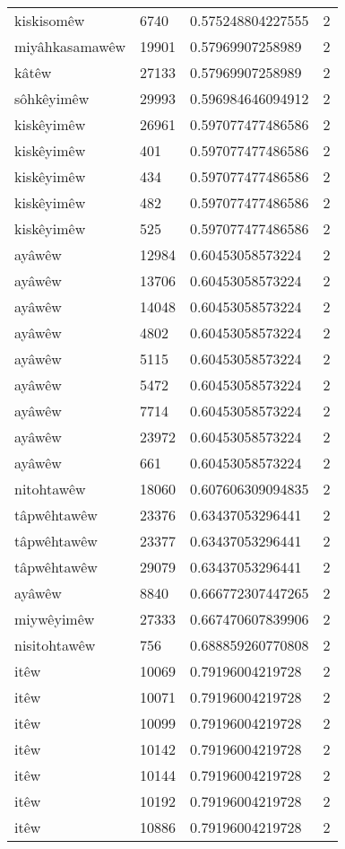 \begin{longtable}{llll}
kiskisomêw & 6740 & 0.575248804227555 & 2\\
miyâhkasamawêw & 19901 & 0.57969907258989 & 2\\
kâtêw & 27133 & 0.57969907258989 & 2\\
sôhkêyimêw & 29993 & 0.596984646094912 & 2\\
kiskêyimêw & 26961 & 0.597077477486586 & 2\\
kiskêyimêw & 401 & 0.597077477486586 & 2\\
kiskêyimêw & 434 & 0.597077477486586 & 2\\
kiskêyimêw & 482 & 0.597077477486586 & 2\\
kiskêyimêw & 525 & 0.597077477486586 & 2\\
ayâwêw & 12984 & 0.60453058573224 & 2\\
ayâwêw & 13706 & 0.60453058573224 & 2\\
ayâwêw & 14048 & 0.60453058573224 & 2\\
ayâwêw & 4802 & 0.60453058573224 & 2\\
ayâwêw & 5115 & 0.60453058573224 & 2\\
ayâwêw & 5472 & 0.60453058573224 & 2\\
ayâwêw & 7714 & 0.60453058573224 & 2\\
ayâwêw & 23972 & 0.60453058573224 & 2\\
ayâwêw & 661 & 0.60453058573224 & 2\\
nitohtawêw & 18060 & 0.607606309094835 & 2\\
tâpwêhtawêw & 23376 & 0.63437053296441 & 2\\
tâpwêhtawêw & 23377 & 0.63437053296441 & 2\\
tâpwêhtawêw & 29079 & 0.63437053296441 & 2\\
ayâwêw & 8840 & 0.666772307447265 & 2\\
miywêyimêw & 27333 & 0.667470607839906 & 2\\
nisitohtawêw & 756 & 0.688859260770808 & 2\\
itêw & 10069 & 0.79196004219728 & 2\\
itêw & 10071 & 0.79196004219728 & 2\\
itêw & 10099 & 0.79196004219728 & 2\\
itêw & 10142 & 0.79196004219728 & 2\\
itêw & 10144 & 0.79196004219728 & 2\\
itêw & 10192 & 0.79196004219728 & 2\\
itêw & 10886 & 0.79196004219728 & 2\\

\end{longtable}

